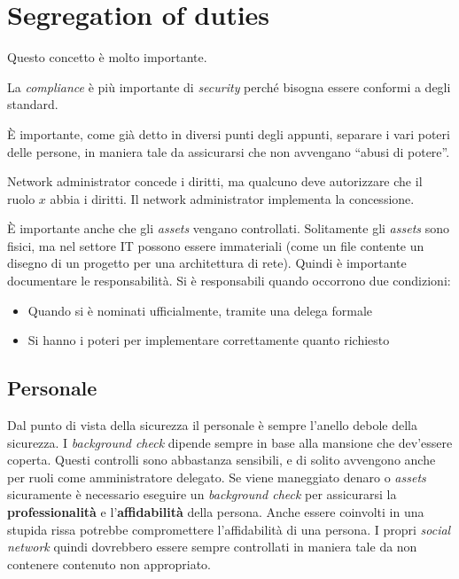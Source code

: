 \section{Segregation of duties}

Questo concetto è molto importante.

La \textit{compliance} è più importante di \textit{security} perché bisogna 
essere conformi a degli standard.

È importante, come già detto in diversi punti degli appunti, separare i vari 
poteri delle persone, in maniera tale da assicurarsi che non avvengano ``abusi 
di potere''.

Network administrator concede i diritti, ma qualcuno deve autorizzare che il 
ruolo $x$ abbia i diritti. Il network administrator implementa la concessione. 


È importante anche che gli \textit{assets} vengano controllati. Solitamente gli 
\textit{assets} sono fisici, ma nel settore IT possono essere immateriali (come 
un file contente un disegno di un progetto per una architettura di rete). Quindi 
è importante documentare le responsabilità. Si è responsabili quando occorrono 
due condizioni:
\begin{itemize}
\item Quando si è nominati ufficialmente, tramite una delega formale
\item Si hanno i poteri per implementare correttamente quanto richiesto
\end{itemize}

\subsection{Personale}

Dal punto di vista della sicurezza il personale è sempre l'anello debole della 
sicurezza. I \textit{background check} dipende sempre in base alla mansione che 
dev'essere coperta. Questi controlli sono abbastanza sensibili, e di solito 
avvengono anche per ruoli come amministratore delegato.
Se viene maneggiato denaro o \textit{assets} sicuramente è necessario eseguire 
un \textit{background check} per assicurarsi la \textbf{professionalità} e 
l'\textbf{affidabilità} della persona. Anche essere coinvolti in una stupida 
rissa potrebbe compromettere l'affidabilità di una persona. I propri 
\textit{social network} quindi dovrebbero essere sempre controllati in maniera 
tale da non contenere contenuto non appropriato.

